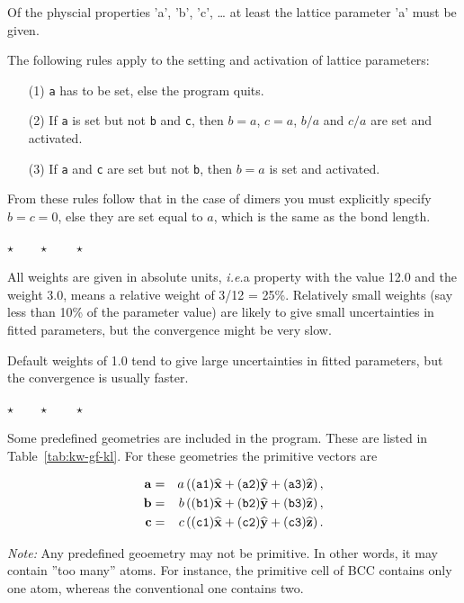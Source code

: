 \documentclass[a4paper,12pt,onecolumn]{article}
\makeatletter
\newcommand{\ie}{\emph{i.e.\@\xspace}}
\def\a{\mathbf{a}}
\def\b{\mathbf{b}}
\def\cc{\mathbf{c}}
\def\xhat{\mathbf{\widehat{x}}}
\def\yhat{\mathbf{\widehat{y}}}
\def\zhat{\mathbf{\widehat{z}}}
\newcommand{\stars}{\begin{center} \vspace{0.5cm}$\star \qquad \star \qquad \star$\vspace{0.5cm}\end{center}}
\makeatother
\begin{document}
Of the physcial properties 'a', 'b', 'c', \ldots
at least the lattice parameter 'a' must be given.

The following rules apply to the setting and activation of lattice parameters:

\begin{itemize}
\item[(1)] \verb+a+ has to be set, else the program quits.
%
\item[(2)] If \verb+a+ is set but not \verb+b+ and \verb+c+, then
$b = a$, $c = a$, $b/a$ and $c/a$ are set and activated.
%
\item[(3)] If \verb+a+ and \verb+c+ are set but not \verb+b+, then
$b = a$ is set and activated.
\end{itemize}

From these rules follow that in the case of dimers you must explicitly
specify $b = c = 0$, else they are set equal to $a$, which is the same
as the bond length.


\stars


All weights are given in absolute units, \ie a property with the value
12.0 and the weight 3.0, means a relative weight of 3/12 = 25\%.
Relatively small weights (say less than 10\% of the parameter value)
are likely to give small uncertainties in fitted
parameters, but the convergence might be very slow.

Default weights of 1.0 tend to give large uncertainties in fitted
parameters, but the convergence is usually faster.


\stars


Some predefined geometries are included in the program. These are listed in
Table~\ref{tab:kw-gf-kl}. For these geometries the primitive vectors are

\begin{eqnarray}
\a  &=& a \left( (\verb+a1+) \xhat + (\verb+a2+) \yhat + (\verb+a3+) \zhat \right), \\
\b  &=& b \left( (\verb+b1+) \xhat + (\verb+b2+) \yhat + (\verb+b3+) \zhat \right), \\
\cc &=& c \left( (\verb+c1+) \xhat + (\verb+c2+) \yhat + (\verb+c3+) \zhat \right).
\end{eqnarray}

\textit{Note:} Any predefined geoemetry may not be primitive. In other words,
it may contain ''too many'' atoms. For instance, the primitive cell of BCC contains
only one atom, whereas the conventional one contains two.
\end{document}
